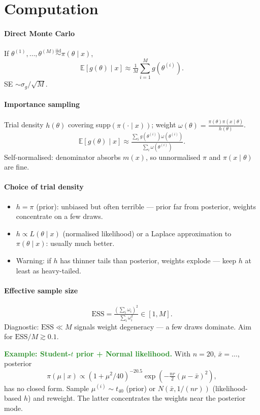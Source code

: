 
\section{Computation}

\paragraph{Direct Monte Carlo}
If $\theta^{(1)},\ldots,\theta^{(M)}\stackrel{\text{iid}}{\sim}\pi(\theta\mid x)$,
\[\mathbb{E}[g(\theta)\mid x]\approx \tfrac{1}{M}\sum_{i=1}^{M}g(\theta^{(i)}).\]
SE $\sim \sigma_g/\sqrt{M}$.

\paragraph{Importance sampling}
Trial density $h(\theta)$ covering supp$(\pi(\cdot\mid x))$; weight $\omega(\theta)=\tfrac{\pi(\theta)\pi(x\mid\theta)}{h(\theta)}$.
\[\mathbb{E}[g(\theta)\mid x]\approx \tfrac{\sum_i g(\theta^{(i)})\omega(\theta^{(i)})}{\sum_i \omega(\theta^{(i)})}.\]
\textcolor{Bittersweet}{Self-normalised}: denominator absorbs $m(x)$, so unnormalised $\pi$ and $\pi(x\mid\theta)$ are fine.

\paragraph{Choice of trial density}
\begin{itemize}
  \item $h=\pi$ (prior): unbiased but often terrible — prior far from posterior, weights concentrate on a few draws.
  \item $h\propto L(\theta\mid x)$ (normalised likelihood) or a Laplace approximation to $\pi(\theta\mid x)$: usually much better.
  \item \textcolor{Bittersweet}{Warning}: if $h$ has thinner tails than posterior, weights explode — keep $h$ at least as heavy-tailed.
\end{itemize}

\paragraph{Effective sample size}
\[\mathrm{ESS}=\tfrac{(\sum_i\omega_i)^{2}}{\sum_i\omega_i^{2}}\in[1,M].\]
\textcolor{Bittersweet}{Diagnostic}: $\mathrm{ESS}\ll M$ signals weight degeneracy — a few draws dominate. Aim for $\mathrm{ESS}/M\gtrsim 0.1$.

\textcolor{ForestGreen}{\textbf{Example: Student-$t$ prior + Normal likelihood.}} With $n=20$, $\bar x=\ldots$, posterior
\[\pi(\mu\mid x)\propto (1+\mu^{2}/40)^{-20.5}\exp\!\left(-\tfrac{nr}{2}(\mu-\bar x)^{2}\right),\]
has no closed form. Sample $\mu^{(i)}\sim t_{40}$ (prior) or $N(\bar x,1/(nr))$ (likelihood-based $h$) and reweight. The latter concentrates the weights near the posterior mode.
